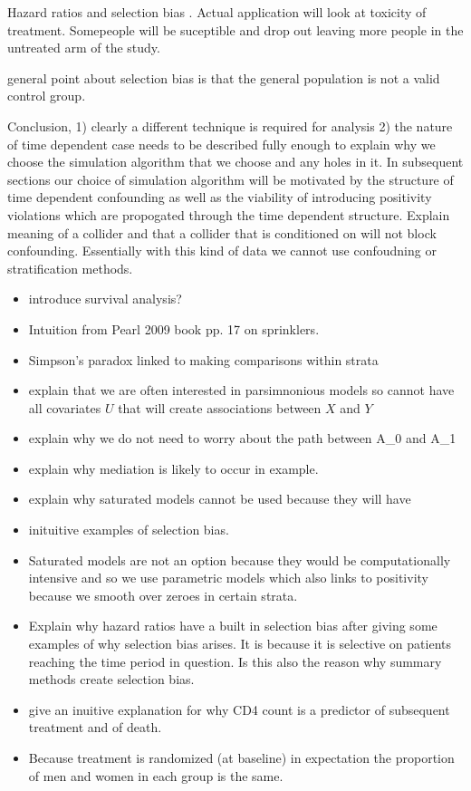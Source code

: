 \documentclass[11pt]{article}
\providecommand{\tightlist}{%
      \setlength{\itemsep}{0pt}\setlength{\parskip}{0pt}}
\begin{document}
Hazard ratios and selection bias \citet{Hernan2010}. Actual application
will look at toxicity of treatment. Somepeople will be suceptible and
drop out leaving more people in the untreated arm of the study.

general point about selection bias is that the general population is not
a valid control group.

Conclusion, 1) clearly a different technique is required for analysis 2)
the nature of time dependent case needs to be described fully enough to
explain why we choose the simulation algorithm that we choose and any
holes in it. In subsequent sections our choice of simulation algorithm
will be motivated by the structure of time dependent confounding as well
as the viability of introducing positivity violations which are
propogated through the time dependent structure. Explain meaning of a
collider and that a collider that is conditioned on will not block
confounding. Essentially with this kind of data we cannot use
confoudning or stratification methods.

\begin{itemize}
\tightlist
\item
  introduce survival analysis?
\item
  Intuition from Pearl 2009 book pp. 17 on sprinklers.
\item
  Simpson's paradox linked to making comparisons within strata
\item
  explain that we are often interested in parsimnonious models so cannot
  have all covariates \(U\) that will create associations between \(X\)
  and \(Y\)
\item
  explain why we do not need to worry about the path between A\_0 and
  A\_1
\item
  explain why mediation is likely to occur in example.
\item
  explain why saturated models cannot be used because they will have
\item
  inituitive examples of selection bias.
\item
  Saturated models are not an option because they would be
  computationally intensive and so we use parametric models which also
  links to positivity because we smooth over zeroes in certain strata.
\item
  Explain why hazard ratios have a built in selection bias after giving
  some examples of why selection bias arises. It is because it is
  selective on patients reaching the time period in question. Is this
  also the reason why summary methods create selection bias.
\item
  give an inuitive explanation for why CD4 count is a predictor of
  subsequent treatment and of death.
\item
  Because treatment is randomized (at baseline) in expectation the
  proportion of men and women in each group is the same.
\end{itemize}
\end{document}
